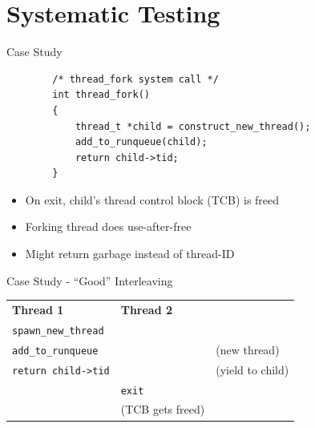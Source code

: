 \documentclass[xcolor=dvipsnames]{beamer}
\begin{document}
\newcommand\related[1]{\textsuperscript{\em [#1]}}

\newcommand\dontcompilethis[1]{}



\section{Systematic Testing}


\begin{frame}[fragile]{Case Study}
	\begin{center}
	\begin{verbatim}
	    /* thread_fork system call */
	    int thread_fork()
	    {
	        thread_t *child = construct_new_thread();
	        add_to_runqueue(child);
	        return child->tid;
	    }
	\end{verbatim}
	\end{center}
	\pause

	\begin{itemize}
		\item On exit, child's thread control block (TCB) is freed
		\item Forking thread does use-after-free
		\item Might return garbage instead of thread-ID
	\end{itemize}
\end{frame}

\begin{frame}{Case Study - ``Good'' Interleaving}
	\begin{tabular}{|l|l|l}
		\cline{1-2}
		\cellcolor{thread1} {\bf Thread 1} & \cellcolor{thread2} {\bf Thread 2} & \\
		\cline{1-2}
		\texttt{spawn\_new\_thread} && \\
		\cline{1-2}
		\texttt{add\_to\_runqueue} && (new thread) \\
		\cline{1-2}
		\texttt{return child->tid} && (yield to child) \\
		\cline{1-2}
		& \texttt{exit} & \\
		\cline{1-2}
		& (TCB gets freed) & \\
		\cline{1-2}
	\end{tabular}
\end{frame}
\end{document}
